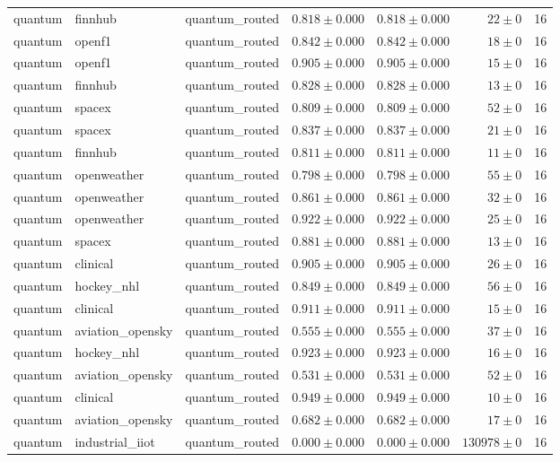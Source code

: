\begin{table}[htbp]
\begin{tabular}{l l l r r r r}
quantum & finnhub & quantum\_routed & $0.818\pm0.000$ & $0.818\pm0.000$ & $22\pm0$ & 16 \\
quantum & openf1 & quantum\_routed & $0.842\pm0.000$ & $0.842\pm0.000$ & $18\pm0$ & 16 \\
quantum & openf1 & quantum\_routed & $0.905\pm0.000$ & $0.905\pm0.000$ & $15\pm0$ & 16 \\
quantum & finnhub & quantum\_routed & $0.828\pm0.000$ & $0.828\pm0.000$ & $13\pm0$ & 16 \\
quantum & spacex & quantum\_routed & $0.809\pm0.000$ & $0.809\pm0.000$ & $52\pm0$ & 16 \\
quantum & spacex & quantum\_routed & $0.837\pm0.000$ & $0.837\pm0.000$ & $21\pm0$ & 16 \\
quantum & finnhub & quantum\_routed & $0.811\pm0.000$ & $0.811\pm0.000$ & $11\pm0$ & 16 \\
quantum & openweather & quantum\_routed & $0.798\pm0.000$ & $0.798\pm0.000$ & $55\pm0$ & 16 \\
quantum & openweather & quantum\_routed & $0.861\pm0.000$ & $0.861\pm0.000$ & $32\pm0$ & 16 \\
quantum & openweather & quantum\_routed & $0.922\pm0.000$ & $0.922\pm0.000$ & $25\pm0$ & 16 \\
quantum & spacex & quantum\_routed & $0.881\pm0.000$ & $0.881\pm0.000$ & $13\pm0$ & 16 \\
quantum & clinical & quantum\_routed & $0.905\pm0.000$ & $0.905\pm0.000$ & $26\pm0$ & 16 \\
quantum & hockey\_nhl & quantum\_routed & $0.849\pm0.000$ & $0.849\pm0.000$ & $56\pm0$ & 16 \\
quantum & clinical & quantum\_routed & $0.911\pm0.000$ & $0.911\pm0.000$ & $15\pm0$ & 16 \\
quantum & aviation\_opensky & quantum\_routed & $0.555\pm0.000$ & $0.555\pm0.000$ & $37\pm0$ & 16 \\
quantum & hockey\_nhl & quantum\_routed & $0.923\pm0.000$ & $0.923\pm0.000$ & $16\pm0$ & 16 \\
quantum & aviation\_opensky & quantum\_routed & $0.531\pm0.000$ & $0.531\pm0.000$ & $52\pm0$ & 16 \\
quantum & clinical & quantum\_routed & $0.949\pm0.000$ & $0.949\pm0.000$ & $10\pm0$ & 16 \\
quantum & aviation\_opensky & quantum\_routed & $0.682\pm0.000$ & $0.682\pm0.000$ & $17\pm0$ & 16 \\
quantum & industrial\_iiot & quantum\_routed & $0.000\pm0.000$ & $0.000\pm0.000$ & $130978\pm0$ & 16 \\

\end{tabular}
\end{table}
